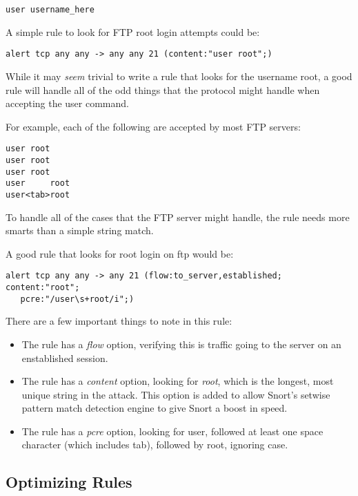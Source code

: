 \documentclass[english]{report}
\begin{document}
\begin{verbatim}
user username_here
\end{verbatim}

A simple rule to look for FTP root login attempts could be:

\begin{verbatim}
alert tcp any any -> any any 21 (content:"user root";)
\end{verbatim}

While it may \emph{seem} trivial to write a rule that looks for the username
root, a good rule will handle all of the odd things that the protocol might
handle when accepting the user command.

For example, each of the following are accepted by most FTP servers:

\begin{verbatim}
user root
user root
user root
user     root
user<tab>root
\end{verbatim}

To handle all of the cases that the FTP server might handle, the rule needs
more smarts than a simple string match.

A good rule that looks for root login on ftp would be:

\begin{verbatim}
alert tcp any any -> any 21 (flow:to_server,established; content:"root";
   pcre:"/user\s+root/i";)
\end{verbatim}

There are a few important things to note in this rule:
\begin{itemize}
\item The rule has a \emph{flow} option, verifying this is traffic going to the server on an enstablished session.
\item The rule has a \emph{content} option, looking for \emph{root}, which is
the longest, most unique string in the attack.  This option is added to allow
Snort's setwise pattern match detection engine to give Snort a boost in speed.
\item The rule has a \emph{pcre} option, looking for user, followed at least one space character (which includes tab), followed by root, ignoring case.
\end{itemize}

\subsection{Optimizing Rules}
\end{document}
